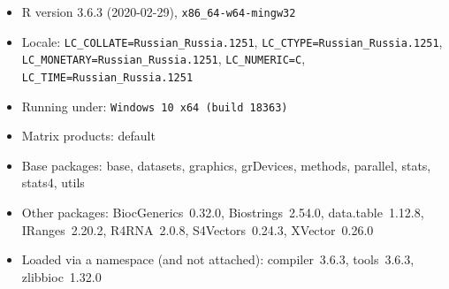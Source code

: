 \documentclass[letterpaper]{article}
\begin{document}
\begin{itemize}\raggedright
  \item R version 3.6.3 (2020-02-29), \verb|x86_64-w64-mingw32|
  \item Locale: \verb|LC_COLLATE=Russian_Russia.1251|, \verb|LC_CTYPE=Russian_Russia.1251|, \verb|LC_MONETARY=Russian_Russia.1251|, \verb|LC_NUMERIC=C|, \verb|LC_TIME=Russian_Russia.1251|
  \item Running under: \verb|Windows 10 x64 (build 18363)|
  \item Matrix products: default
  \item Base packages: base, datasets, graphics, grDevices, methods,
    parallel, stats, stats4, utils
  \item Other packages: BiocGenerics~0.32.0, Biostrings~2.54.0,
    data.table~1.12.8, IRanges~2.20.2, R4RNA~2.0.8, S4Vectors~0.24.3,
    XVector~0.26.0
  \item Loaded via a namespace (and not attached): compiler~3.6.3,
    tools~3.6.3, zlibbioc~1.32.0
\end{itemize}
\end{document}
